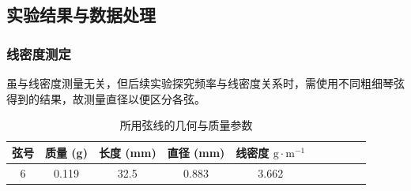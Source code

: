 \documentclass[UTF8]{article}
\theoremstyle{MyLineTheoremStyle} %
\theoremstyle{MyBlockTheoremStyle} %
\theoremstyle{MySubsubsectionStyle} %
\begin{document}
\subsection{实验结果与数据处理}
\subsubsection{线密度测定}
虽与线密度测量无关，但后续实验探究频率与线密度关系时，需使用不同粗细琴弦得到的结果，故测量直径以便区分各弦。
\begin{table}[H]\centering
    \caption{所用弦线的几何与质量参数}
    \label{所用弦线的几何与质量参数}
\begin{tabular}{cccccccccc}\toprule
    弦号 & 质量 (g) & 长度 (mm) & 直径 (mm) & 线密度 $\mathrm{g\cdot m^{-1}}$ \\
    \midrule
    6 & 0.119 & 32.5 &	0.883 &	3.662 \\
    \bottomrule
\end{tabular}
\end{table}
\end{document}
